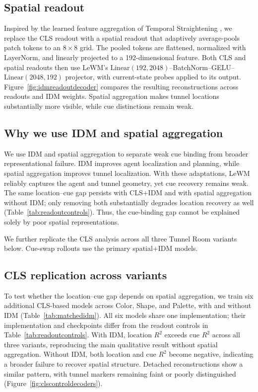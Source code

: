 \subsection{Spatial readout}
Inspired by the learned feature aggregation of Temporal Straightening
\citep{wang2026temporal}, we replace the CLS readout with a spatial readout
that adaptively average-pools patch tokens to an $8\times8$ grid. The pooled
tokens are flattened, normalized with LayerNorm, and linearly projected to a
192-dimensional feature. Both CLS and spatial readouts then use LeWM's
$\mathrm{Linear}(192,2048)$--BatchNorm--GELU--$\mathrm{Linear}(2048,192)$
projector, with current-state probes applied to its output.
Figure~\ref{fig:idmreadoutdecoder} compares the resulting reconstructions
across readouts and IDM weights. Spatial aggregation makes tunnel locations
substantially more visible, while cue distinctions remain weak.

\subsection{Why we use IDM and spatial aggregation}
We use IDM and spatial aggregation to separate weak cue binding from broader
representational failure. IDM improves agent localization and planning, while
spatial aggregation improves tunnel localization. With these adaptations,
LeWM reliably captures the agent and tunnel geometry, yet cue recovery remains
weak. The same location--cue gap persists with CLS+IDM and with spatial
aggregation without IDM; only removing both substantially degrades location
recovery as well (Table~\ref{tab:readoutcontrols}). Thus, the cue-binding gap
cannot be explained solely by poor spatial representations.

We further replicate the CLS analysis across all three Tunnel Room variants
below. Cue-swap rollouts use the primary spatial+IDM models.

\FloatBarrier

\subsection{CLS replication across variants}
\label{app:clsreplication}

To test whether the location--cue gap depends on spatial aggregation, we train
six additional CLS-based models across Color, Shape, and Palette, with and
without IDM (Table~\ref{tab:matchedidm}). All six models share one
implementation; their implementation and checkpoints differ from the readout controls in
Table~\ref{tab:readoutcontrols}. With IDM, location $R^2$ exceeds cue $R^2$
across all three variants, reproducing the main qualitative result without
spatial aggregation. Without IDM, both location and cue $R^2$ become negative,
indicating a broader failure to recover spatial structure. Detached
reconstructions show a similar pattern, with tunnel markers remaining faint
or poorly distinguished (Figure~\ref{fig:clscontroldecoders}).


